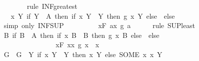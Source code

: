 \begin{isabellebody}
\ \ \ \ \ \ \isamarkupfalse%
\ {\isacharparenleft}{\kern0pt}rule\ INF{\isacharunderscore}{\kern0pt}greatest{\isacharparenright}{\kern0pt}\isanewline
\ \ \ \ \isamarkupfalse%
\ \isamarkupfalse%
\ {\isachardoublequoteopen}{\isachardot}{\kern0pt}{\isachardot}{\kern0pt}{\isachardot}{\kern0pt}\ {\isacharequal}{\kern0pt}\ {\isacharparenleft}{\kern0pt}{\isasymSqunion}x{\isachardot}{\kern0pt}\ {\isasymSqinter}Y{\isachardot}{\kern0pt}\ if\ Y\ {\isasymin}\ A\ then\ if\ x\ Y\ {\isasymin}\ Y\ then\ g\ {\isacharparenleft}{\kern0pt}x\ Y{\isacharparenright}{\kern0pt}\ else\ {\isasymbottom}\ else\ {\isasymtop}{\isacharparenright}{\kern0pt}{\isachardoublequoteclose}\isanewline
\ \ \ \ \ \ \isamarkupfalse%
\ {\isacharparenleft}{\kern0pt}simp\ only{\isacharcolon}{\kern0pt}\ INF{\isacharunderscore}{\kern0pt}SUP{\isacharparenright}{\kern0pt}\isanewline
\ \ \ \ \isamarkupfalse%
\ \isamarkupfalse%
\ {\isachardoublequoteopen}{\isachardot}{\kern0pt}{\isachardot}{\kern0pt}{\isachardot}{\kern0pt}\ {\isasymle}\ {\isacharparenleft}{\kern0pt}{\isasymSqunion}x{\isasymin}{\isacharquery}{\kern0pt}F{\isachardot}{\kern0pt}\ {\isasymSqinter}a{\isasymin}x{\isachardot}{\kern0pt}\ g\ a{\isacharparenright}{\kern0pt}{\isachardoublequoteclose}\isanewline
\ \ \ \ \isamarkupfalse%
\ {\isacharparenleft}{\kern0pt}rule\ SUP{\isacharunderscore}{\kern0pt}least{\isacharparenright}{\kern0pt}\isanewline
\ \ \ \ \ \ \isamarkupfalse%
\ {\isachardoublequoteopen}{\isacharparenleft}{\kern0pt}{\isasymSqinter}B{\isachardot}{\kern0pt}\ if\ B\ {\isasymin}\ A\ then\ if\ x\ B\ {\isasymin}\ B\ then\ g\ {\isacharparenleft}{\kern0pt}x\ B{\isacharparenright}{\kern0pt}\ else\ {\isasymbottom}\ else\ {\isasymtop}{\isacharparenright}{\kern0pt}\isanewline
\ \ \ \ \ \ \ \ \ \ \ \ \ \ \ {\isasymle}\ {\isacharparenleft}{\kern0pt}{\isasymSqunion}x{\isasymin}{\isacharquery}{\kern0pt}F{\isachardot}{\kern0pt}\ {\isasymSqinter}x{\isasymin}x{\isachardot}{\kern0pt}\ g\ x{\isacharparenright}{\kern0pt}{\isachardoublequoteclose}\ \ x\isanewline
\ \ \ \ \ \ \isamarkupfalse%
\ {\isacharminus}{\kern0pt}\isanewline
\ \ \ \ \ \ \ \ \isamarkupfalse%
\ G\ \ {\isachardoublequoteopen}G\ {\isasymequiv}\ {\isasymlambda}Y{\isachardot}{\kern0pt}\ if\ x\ Y\ {\isasymin}\ Y\ then\ x\ Y\ else\ {\isacharparenleft}{\kern0pt}SOME\ x{\isachardot}{\kern0pt}\ x\ {\isasymin}Y{\isacharparenright}{\kern0pt}{\isachardoublequoteclose}\isanewline
\ \ \ \ \ \ \ \ \isamarkupfalse%

\end{isabellebody}
